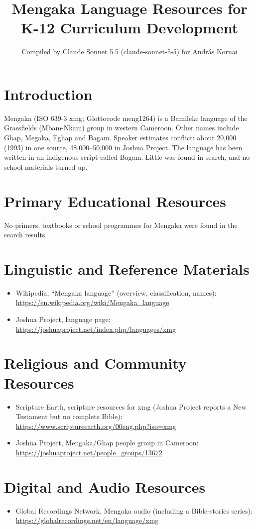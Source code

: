 \documentclass[12pt]{article}
\title{Mengaka Language Resources for K-12 Curriculum Development}
\author{Compiled by Claude Sonnet 5.5 (claude-sonnet-5-5) for Andr\'as Kornai}
\date{}
\begin{document}
\maketitle

\section{Introduction}
Mengaka (ISO 639-3 xmg; Glottocode meng1264) is a Bamileke language of the Grassfields (Mbam-Nkam) group in western Cameroon. Other names include Ghap, Megaka, Eghap and Bagam. Speaker estimates conflict: about 20,000 (1993) in one source, 48,000--50,000 in Joshua Project. The language has been written in an indigenous script called Bagam. Little was found in search, and no school materials turned up.

\section{Primary Educational Resources}
No primers, textbooks or school programmes for Mengaka were found in the search results.

\section{Linguistic and Reference Materials}
\begin{itemize}
\item Wikipedia, ``Mengaka language'' (overview, classification, names): \url{https://en.wikipedia.org/wiki/Mengaka_language}
\item Joshua Project, language page: \url{https://joshuaproject.net/index.php/languages/xmg}
\end{itemize}

\section{Religious and Community Resources}
\begin{itemize}
\item Scripture Earth, scripture resources for xmg (Joshua Project reports a New Testament but no complete Bible): \url{https://www.scriptureearth.org/00eng.php?iso=xmg}
\item Joshua Project, Mengaka/Ghap people group in Cameroon: \url{https://joshuaproject.net/people_groups/13672}
\end{itemize}

\section{Digital and Audio Resources}
\begin{itemize}
\item Global Recordings Network, Mengaka audio (including a Bible-stories series): \url{https://globalrecordings.net/en/language/xmg}
\end{itemize}
\end{document}
